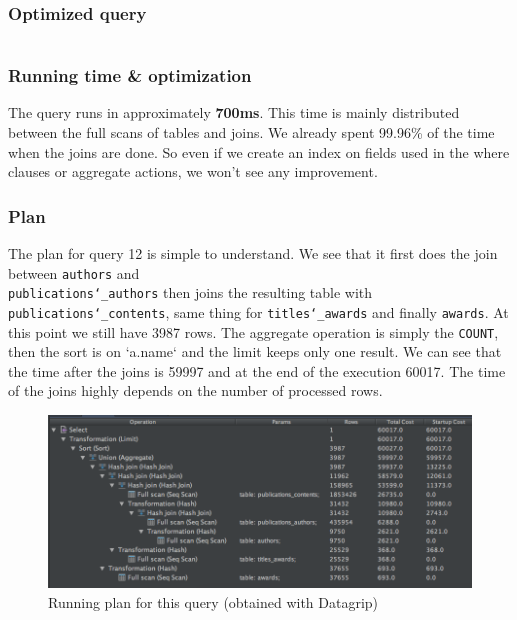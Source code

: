 \documentclass[doubleside, titlepage]{article}
\begin{document}
\subsubsection{Optimized query}
		\begin{lstlisting}[language=SQL,showspaces=false,basicstyle=\ttfamily,numberstyle=\tiny,commentstyle=\color{gray}]

		\end{lstlisting}
		
\subsubsection{Running time \& optimization}

The query runs in approximately \textbf{700ms}. This time is mainly distributed between the full scans of tables and joins. We already spent 99.96\% of the time when the joins are done. So even if we create an index on fields used in the where clauses or aggregate actions, we won't see any improvement.

\subsubsection{Plan}
The plan for query 12 is simple to understand. We see that it first does the join between \texttt{authors} and ~\\ \texttt{publications\char`_authors} then joins the resulting table with \texttt{publications\char`_contents}, same thing for \texttt{titles\char`_awards} and finally \texttt{awards}. At this point we still have 3987 rows. The aggregate operation is simply the \texttt{COUNT}, then the sort is on `a.name` and the limit keeps only one result.
We can see that the time after the joins is 59997 and at the end of the execution 60017. The time of the joins highly depends on the number of processed rows.

\begin{figure}[!htb]
	\centering
    \includegraphics[scale = 0.5]{./query_analysis/query12}
    \caption{Running plan for this query (obtained with Datagrip)}
\end{figure}
\end{document}
